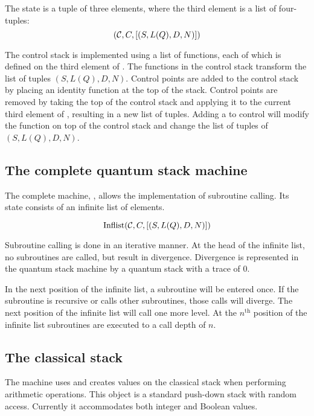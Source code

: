 The \cms{} state is a tuple of three elements, where the third element
is a list of four-tuples:
\begin{equation}
(\mathcal{C}, C , [(S,L(Q),D,N)]) \label{eq:controlmachinestate}
\end{equation}



The control stack is implemented using 
a list of functions, each of which is defined on the third element of
\cms. The functions in the control stack
transform the list of  tuples $(S,L(Q),D,N)$.  Control points are
added to the control stack 
by placing an identity function at the top of
the stack. Control points are removed by taking the top of the control stack
and applying it to the current third element of \cms, resulting in
a new list of tuples.
Adding a \qbit{} to control will modify the function on top of the control
stack
and change the list of tuples of $(S,L(Q),D,N)$.

\subsection{The complete quantum stack machine}\label{subsec:machinestate}

The complete machine, \ms,  allows the  implementation of  subroutine calling.
Its state consists of 
an infinite list of \cms{} elements.

\begin{equation}
\text{Inflist}{(\ensuremath{\mathcal{C}}, C , [(S,L(Q),D,N)])} \label{eq:machinestate}
\end{equation}


Subroutine calling is done in an iterative manner. At the head of the
infinite list, no subroutines are called, but result in divergence.
Divergence is represented in the quantum stack machine by a quantum 
stack with a trace of $0$.

In the next position of the infinite list, a subroutine will be entered once.
If the subroutine
 is recursive or calls other subroutines, those calls will diverge. 
The next position of the infinite list will call one more
level. At the $n^{\mathrm{th}}$ position of the infinite list 
subroutines are executed to a call depth of $n$.

\subsection{The classical stack}\label{subsec:repauxclassicalstack}
The machine uses and creates values
on the classical stack when performing arithmetic operations. 
This object is a standard 
push-down stack with random access.
Currently it accommodates both integer and Boolean values.

